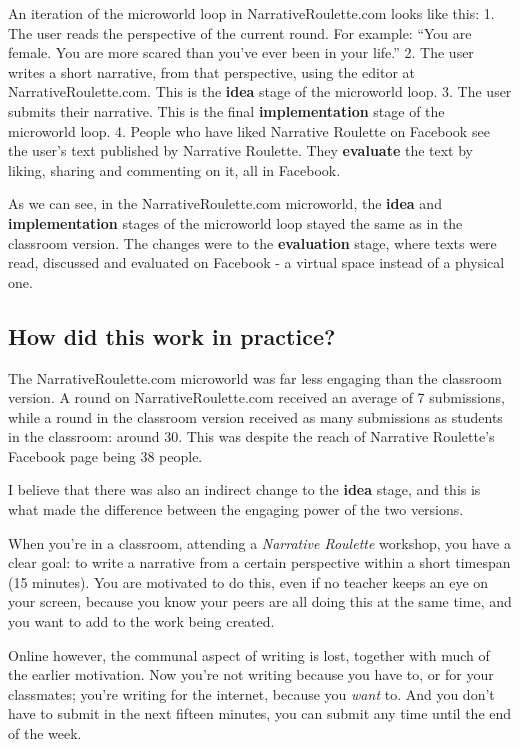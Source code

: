 An iteration of the microworld loop in NarrativeRoulette.com looks like
this: 1. The user reads the perspective of the current round. For
example: ``You are female. You are more scared than you've ever been in
your life.'' 2. The user writes a short narrative, from that
perspective, using the editor at NarrativeRoulette.com. This is the
\textbf{idea} stage of the microworld loop. 3. The user submits their
narrative. This is the final \textbf{implementation} stage of the
microworld loop. 4. People who have liked Narrative Roulette on Facebook
see the user's text published by Narrative Roulette. They
\textbf{evaluate} the text by liking, sharing and commenting on it, all
in Facebook.

As we can see, in the NarrativeRoulette.com microworld, the
\textbf{idea} and \textbf{implementation} stages of the microworld loop
stayed the same as in the classroom version. The changes were to the
\textbf{evaluation} stage, where texts were read, discussed and
evaluated on Facebook - a virtual space instead of a physical one.

\subsection{How did this work in practice?}

The NarrativeRoulette.com microworld was far less engaging than the
classroom version. A round on NarrativeRoulette.com received an average
of 7 submissions, while a round in the classroom version received as
many submissions as students in the classroom: around 30. This was
despite the reach of Narrative Roulette's Facebook page being 38 people.

I believe that there was also an indirect change to the \textbf{idea}
stage, and this is what made the difference between the engaging power
of the two versions.

When you're in a classroom, attending a \emph{Narrative Roulette}
workshop, you have a clear goal: to write a narrative from a certain
perspective within a short timespan (15 minutes). You are motivated to
do this, even if no teacher keeps an eye on your screen, because you
know your peers are all doing this at the same time, and you want to add
to the work being created.

Online however, the communal aspect of writing is lost, together with
much of the earlier motivation. Now you're not writing because you have
to, or for your classmates; you're writing for the internet, because you
\emph{want} to. And you don't have to submit in the next fifteen
minutes, you can submit any time until the end of the week.

